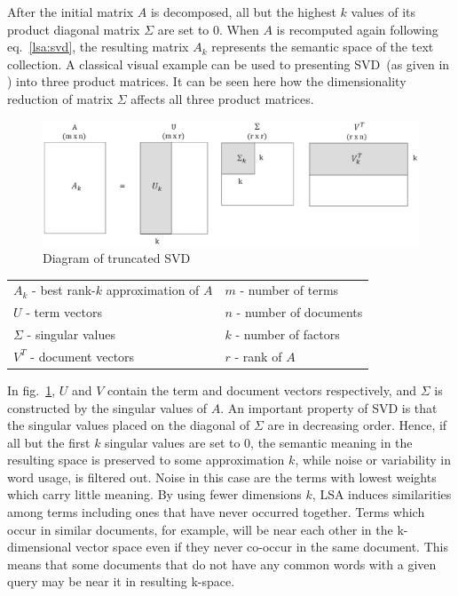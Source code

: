 After the initial matrix $A$ is decomposed, all but the highest $k$ values of its product diagonal matrix $\Sigma$ are set to $0$. When $A$ is recomputed again following eq.~\ref{lsa:svd}, the resulting  matrix $A_{k}$ represents the semantic space of the text collection. A classical visual example can be used to presenting \gls{SVD}~(as given in \cite{Dumais88usingLSA}) into three product matrices. It can be seen here how the dimensionality reduction of matrix $\Sigma$ affects all three product matrices.\\
%
%
\begin{center}
\begin{figure}[htbp]
	\centering
	\includegraphics[width=\ScaleIfNeeded]{img/svd} 
	\caption[Diagram of truncated SVD]%
           {Diagram of truncated SVD}
\label{lsa:truncated_svd}
\end{figure}
%
%
\begin{tabular}{l l}
$A_{k}$ - best rank-$k$ approximation of $A$ & $m$ - number of terms\\
$U$ - term vectors & $n$ - number of documents \\
$\Sigma$ - singular values & $k$ - number of factors \\
$V^{T}$ - document vectors & $r$ - rank of $A$ \\
\end{tabular}
\end{center} 

In fig.~\ref{lsa:truncated_svd}, $U$ and $V$ contain the term and document vectors respectively, and $\Sigma$ is constructed by the singular values of $A$. An important property of \gls{SVD} is that the singular values placed on the diagonal of $\Sigma$ are in decreasing order. Hence, if all but the first $k$ singular values are set to $0$, the semantic meaning in the resulting space is preserved to some approximation $k$, while noise or variability in word usage, is filtered out. Noise in this case are the terms with lowest weights which carry little meaning. By using fewer dimensions $k$, \gls{LSA} induces similarities among terms including ones that have never occurred together. Terms which occur in similar documents, for example, will be near each other in the k-dimensional vector space even if they never co-occur in the same document. This means that some documents that do not have any common words with a given query may be near it in resulting k-space.\\

